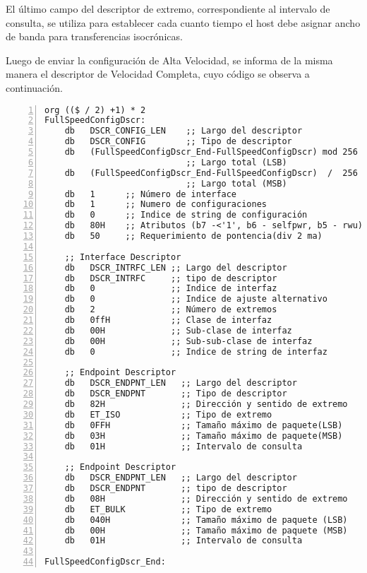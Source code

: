 	El último campo del descriptor de extremo, correspondiente al intervalo de consulta, se utiliza para establecer cada cuanto tiempo el host debe asignar ancho de banda para transferencias isocrónicas.
	
	Luego de enviar la configuración de Alta Velocidad, se informa de la misma manera el descriptor de Velocidad Completa, cuyo código se observa a continuación.
	
	\begin{lstlisting}[language={[x86masm]Assembler},backgroundcolor=\color{gray!30},numbers=left]
org (($ / 2) +1) * 2
FullSpeedConfigDscr:
	db   DSCR_CONFIG_LEN	;; Largo del descriptor
	db   DSCR_CONFIG        ;; Tipo de descriptor
	db   (FullSpeedConfigDscr_End-FullSpeedConfigDscr) mod 256
							;; Largo total (LSB)
	db   (FullSpeedConfigDscr_End-FullSpeedConfigDscr)  /  256 
							;; Largo total (MSB)
	db   1      ;; Número de interface
	db   1      ;; Numero de configuraciones
	db   0      ;; Indice de string de configuración
	db   80H    ;; Atributos (b7 -<'1', b6 - selfpwr, b5 - rwu)
	db   50     ;; Requerimiento de pontencia(div 2 ma)
	
	;; Interface Descriptor
	db   DSCR_INTRFC_LEN ;; Largo del descriptor
	db   DSCR_INTRFC     ;; tipo de descriptor
	db   0               ;; Indice de interfaz
	db   0               ;; Indice de ajuste alternativo
	db   2               ;; Número de extremos
	db   0ffH            ;; Clase de interfaz
	db   00H             ;; Sub-clase de interfaz
	db   00H             ;; Sub-sub-clase de interfaz
	db   0               ;; Indice de string de interfaz
	
	;; Endpoint Descriptor
	db   DSCR_ENDPNT_LEN   ;; Largo del descriptor
	db   DSCR_ENDPNT       ;; Tipo de descriptor
	db   82H               ;; Dirección y sentido de extremo
	db   ET_ISO            ;; Tipo de extremo
	db   0FFH              ;; Tamaño máximo de paquete(LSB)
	db   03H               ;; Tamaño máximo de paquete(MSB)
	db   01H               ;; Intervalo de consulta
	
	;; Endpoint Descriptor
	db   DSCR_ENDPNT_LEN   ;; Largo del descriptor
	db   DSCR_ENDPNT       ;; tipo de descriptor
	db   08H               ;; Dirección y sentido de extremo
	db   ET_BULK           ;; Tipo de extremo
	db   040H              ;; Tamaño máximo de paquete (LSB)
	db   00H               ;; Tamaño máximo de paquete (MSB)
	db   01H               ;; Intervalo de consulta
	
FullSpeedConfigDscr_End:
	\end{lstlisting}

